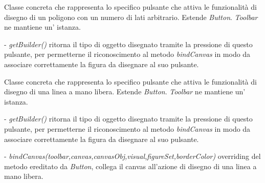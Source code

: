 Classe concreta che rappresenta lo specifico pulsante che attiva le funzionalit\` a di disegno di un poligono con un numero di lati arbitrario.
Estende \textit{Button}.
\textit{Toolbar} ne mantiene un' istanza.
\begin{elencopuntato}[\subsubsecindent]
\item[-] \textit{getBuilder()} ritorna il tipo di oggetto disegnato tramite la pressione di questo pulsante, per permetterne il riconoscimento al metodo \textit{bindCanvas} in modo da associare correttamente la figura da disegnare al suo pulsante.
\end{elencopuntato}

Classe concreta che rappresenta lo specifico pulsante che attiva le funzionalit\` a di disegno di una linea a mano libera.
Estende \textit{Button}.
\textit{Toolbar} ne mantiene un' istanza.
\begin{elencopuntato}[\subsubsecindent]
\item[-] \textit{getBuilder()} ritorna il tipo di oggetto disegnato tramite la pressione di questo pulsante, per permetterne il riconoscimento al metodo \textit{bindCanvas} in modo da associare correttamente la figura da disegnare al suo pulsante.
\item[-]  \textit{bindCanvas(toolbar,canvas,canvasObj,visual,figureSet,borderColor)} overriding del metodo ereditato da \textit{Button}, collega il canvas all'azione di disegno di una linea a mano libera.
\end{elencopuntato}


